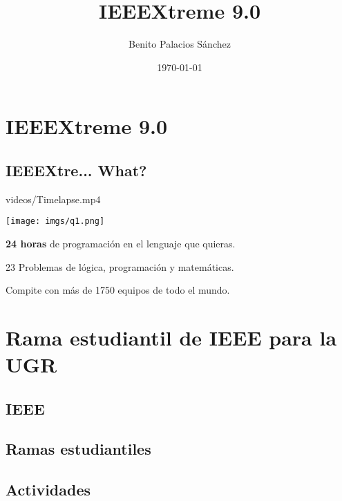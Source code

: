 \documentclass[usenames,dvipsnames]{beamer}
\title{IEEEXtreme 9.0}
\date[Septiembre de 2015]{\today}
\author{Benito Palacios Sánchez}
\institute[IEEE SB UGR]{IEEE Student Branch of Granada}
\begin{document}
\begin{frame}[plain]
    \titlepage
\end{frame}


\section{IEEEXtreme 9.0}
\subsection{IEEEXtre... What?}

\begin{frame}
	       {videos/Timelapse.mp4}
\end{frame}

\begin{frame}
	\texttt{[image: imgs/q1.png]}

  	\begin{wideitemize}
  		\item \textbf{24 horas} de programación en el lenguaje que quieras.
  		\item 23 Problemas de lógica, programación y matemáticas.
  		\item Compite con más de 1750 equipos de todo el mundo.
  	\end{wideitemize}
\end{frame}

\section[IEEE SB UGR]{Rama estudiantil de IEEE para la UGR}
\subsection{IEEE}
\begin{frame}
\end{frame}

\subsection{Ramas estudiantiles}
\begin{frame}
\end{frame}

\subsection{Actividades}
\begin{frame}
\end{frame}
\end{document}
